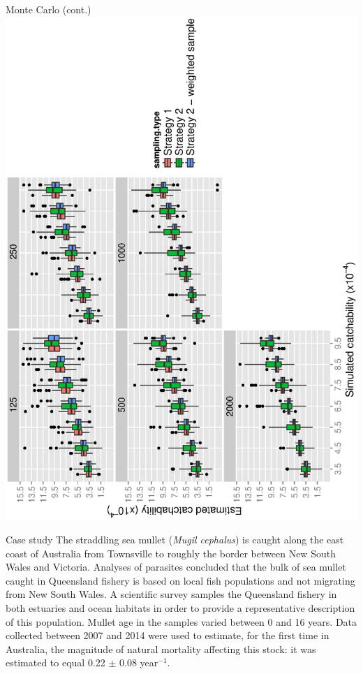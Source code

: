 \documentclass[final]{beamer}
\begin{document}
\begin{frame}{}
\begin{columns}[t]
\begin{column}{.47\linewidth}
\begin{block}{Monte Carlo (cont.)}
        \includegraphics[scale=1.2,angle=-90]{../../Results/Graphics/Estimating-Catchability4PresentationColour.ps}
        
      \end{block}

      \begin{block}{Case study}
        The straddling sea mullet ({\it Mugil cephalus}) is caught along the east coast of Australia from Townsville to roughly the border between New South Wales and Victoria. Analyses of parasites concluded that the bulk of sea mullet caught in Queensland fishery is based on local fish populations and not migrating from New South Wales. A scientific survey samples the Queensland fishery in both estuaries and ocean habitats in order to provide a representative description of this population. Mullet age in the samples varied between 0 and 16 years. Data collected between 2007 and 2014 were used to estimate, for the first time in Australia, the magnitude of natural mortality affecting this stock: it was estimated to equal 0.22 $\pm$ 0.08 year$^{-1}$.
        

\end{block}
\end{column}
\end{columns}
\end{frame}
\end{document}
